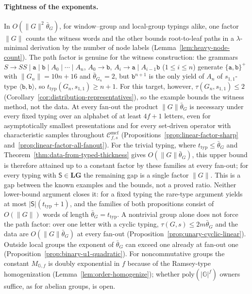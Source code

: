 \documentclass[11pt]{article}
\numberwithin{equation}{section}
\theoremstyle{plain}
\theoremstyle{definition}
\theoremstyle{remark}
\newcommand{\Cmcf}[2]{\mathcal{C}^{\mathrm{mcf}}_{#1,#2}}
\begin{document}
\paragraph{Tightness of the exponents.}
In $O(\|G\|^2\bar\theta_G)$, for window--group and local-group typings alike,
one factor $\|G\|$ counts the witness words and the other bounds root-to-leaf
paths in a $\lambda$-minimal derivation by the number of node labels
(Lemma~\ref{lem:heavy-node-count}).  The path factor is genuine for the witness
construction: the grammars $S\to SS\mid\mathtt a\mid\mathtt b\mid A_0\mid\cdots\mid A_n$,
$A_0\to\mathtt b$, $A_i\to\mathtt a\mid A_{i-1}\mathtt b$ ($1\le i\le n$) generate
$\{\mathtt a,\mathtt b\}^+$ with $\|G_n\|=10n+16$ and $\bar\theta_{G_n}=2$, but
$\mathtt b^{n+1}$ is the only yield of $A_n$ of $s_{1,1}$-type
$\langle\mathtt b,\mathtt b\rangle$, so $t_{\mathrm{typ}}(G_n,s_{1,1})\ge n+1$.  For this
target, however, $\tau(G_n,s_{1,1})\le2$
(Corollary~\ref{cor:distribution-representatives}), so the example bounds the
witness method, not the data.  At every fan-out the product $\|G\|\bar\theta_G$
is necessary under every fixed typing over an alphabet of at least $4f+1$
letters, even for asymptotically smallest
presentations and for every set-driven operator with characteristic samples
throughout $\Cmcf{f}{s}$ (Propositions~\ref{prop:linear-factor-sharp}
and~\ref{prop:linear-factor-all-fanout}).  For the trivial typing, where
$t_{\mathrm{typ}}\le\bar\theta_G$ and Theorem~\ref{thm:data-from-typed-thickness}
gives $O(\|G\|\bar\theta_G)$, this upper bound is therefore attained up to a
constant factor by these families at every fan-out;
for every typing with $\mathsf S\in\mathbf{LG}$ the remaining gap is a single
factor $\|G\|$.  This is a gap between the known examples and the bounds,
not a proved ratio.  Neither lower-bound argument closes it: for a fixed typing
the rare-type argument yields at most $|\mathsf S|(t_{\mathrm{typ}}+1)$, and the
families of both propositions consist of $O(\|G\|)$ words
of length $\bar\theta_G=t_{\mathrm{typ}}$.  A nontrivial group alone does not
force the path factor: over one letter with a cyclic typing,
$\tau(G,s)\le2m\bar\theta_G$ and the data are $O(\|G\|\bar\theta_G)$ at every
fan-out (Proposition~\ref{prop:unary-cyclic-linear}).  Outside local groups the
exponent of $\bar\theta_G$ can exceed one already at fan-out one
(Proposition~\ref{prop:binary-u1-quadratic}).  For
noncommutative groups the constant $M_{\mathbb G,f}$ is doubly exponential in $f$
because of the Ramsey-type homogenization (Lemma~\ref{lem:order-homogenize});
whether $\mathrm{poly}(|\mathbb G|^f)$ owners suffice, as for abelian groups, is open.
\end{document}
